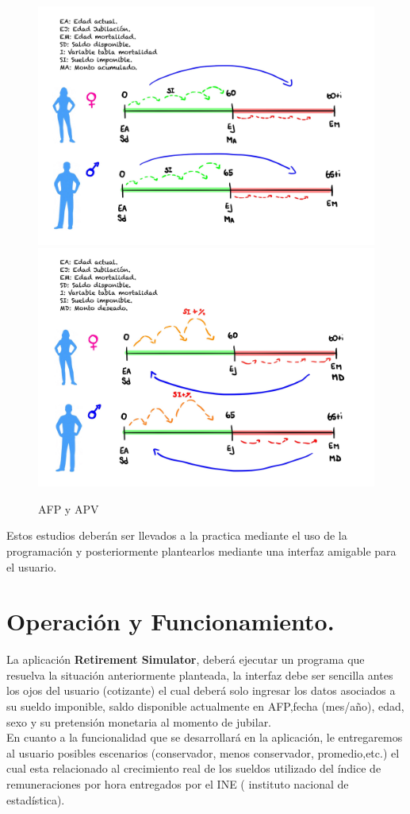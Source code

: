 \documentclass{udpreport}
\begin{document}
\begin{figure}[H]
    \centering
    \includegraphics [scale=0.1]{images/afpp.jpg}
    \includegraphics [scale=0.1]{images/apv.jpg}
    
    \caption{AFP y APV}
\end{figure}

Estos estudios deberán ser llevados a la practica mediante el uso de la programación y posteriormente plantearlos mediante una interfaz amigable para el usuario.

\section{Operación y Funcionamiento.}
La aplicación \textbf{Retirement Simulator}, deberá ejecutar un programa que resuelva la situación anteriormente planteada, la interfaz debe ser sencilla antes los ojos del usuario (cotizante) el cual deberá solo ingresar los datos asociados a su sueldo imponible, saldo disponible actualmente en AFP,fecha (mes/año), edad, sexo y su pretensión monetaria al momento de jubilar. \\
En cuanto a la funcionalidad que se desarrollará en la aplicación, le entregaremos al usuario posibles escenarios (conservador, menos conservador, promedio,etc.) el cual esta relacionado al crecimiento real de los sueldos utilizado del índice de remuneraciones por hora entregados por el INE ( instituto nacional de estadística).
\end{document}
